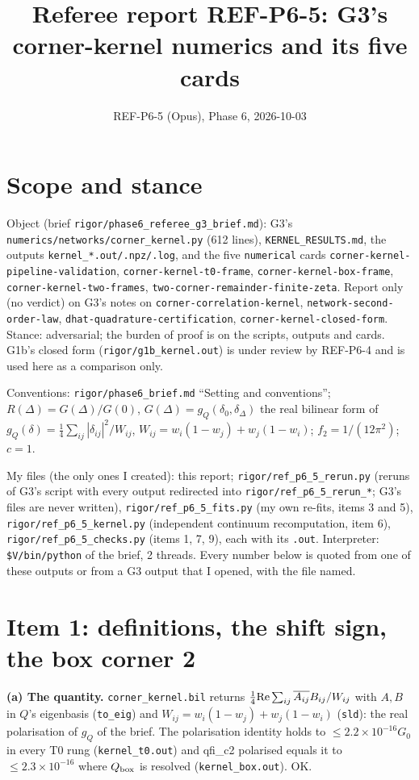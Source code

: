 \documentclass[11pt]{article}
\title{Referee report REF-P6-5: G3's corner-kernel numerics and its five cards}
\author{REF-P6-5 (Opus), Phase 6, 2026-10-03}
\date{}
\begin{document}
\maketitle

\section*{Scope and stance}
Object (brief \texttt{rigor/phase6\_referee\_g3\_brief.md}): G3's \texttt{numerics/networks/corner\_kernel.py} (612 lines),
\texttt{KERNEL\_RESULTS.md}, the outputs \texttt{kernel\_*.out/.npz/.log}, and the five \texttt{numerical} cards
\texttt{corner-kernel-pipeline-validation}, \texttt{corner-kernel-t0-frame}, \texttt{corner-kernel-box-frame},
\texttt{corner-kernel-two-frames}, \texttt{two-corner-remainder-finite-zeta}. Report only (no verdict) on G3's notes
on \texttt{corner-correlation-kernel}, \texttt{network-second-order-law}, \texttt{dhat-quadrature-certification},
\texttt{corner-kernel-closed-form}. Stance: adversarial; the burden of proof is on the scripts, outputs and cards.
G1b's closed form (\texttt{rigor/g1b\_kernel.out}) is under review by REF-P6-4 and is used here as a comparison only.

Conventions: \texttt{rigor/phase6\_brief.md} ``Setting and conventions''; $R(\Delta)=G(\Delta)/G(0)$,
$G(\Delta)=g_Q(\delta_0,\delta_\Delta)$ the real bilinear form of
$g_Q(\delta)=\tfrac14\sum_{ij}|\delta_{ij}|^2/W_{ij}$, $W_{ij}=w_i(1-w_j)+w_j(1-w_i)$;
$f_2=1/(12\pi^2)$; $c=1$.

My files (the only ones I created): this report; \texttt{rigor/ref\_p6\_5\_rerun.py} (reruns of G3's script with every
output redirected into \texttt{rigor/ref\_p6\_5\_rerun\_*}; G3's files are never written), \texttt{rigor/ref\_p6\_5\_fits.py}
(my own re-fits, items 3 and 5), \texttt{rigor/ref\_p6\_5\_kernel.py} (independent continuum recomputation, item 6),
\texttt{rigor/ref\_p6\_5\_checks.py} (items 1, 7, 9), each with its \texttt{.out}. Interpreter:
\texttt{\$V/bin/python} of the brief, 2 threads. Every number below is quoted from one of these outputs or from
a G3 output that I opened, with the file named.

\section{Item 1: definitions, the shift sign, the box corner 2}
\textbf{(a) The quantity.} \texttt{corner\_kernel.bil} returns $\tfrac14{\rm Re}\sum_{ij}\overline{A_{ij}}B_{ij}/W_{ij}$ with
$A,B$ in $Q$'s eigenbasis (\texttt{to\_eig}) and $W_{ij}=w_i(1-w_j)+w_j(1-w_i)$ (\texttt{sld}): the real polarisation of
$g_Q$ of the brief. The polarisation identity holds to $\le2.2\times10^{-16}G_0$ in every T0 rung (\texttt{kernel\_t0.out})
and qfi\_c2 polarised equals it to $\le2.3\times10^{-16}$ where $Q_{\rm box}$ is resolved (\texttt{kernel\_box.out}). OK.
\end{document}
